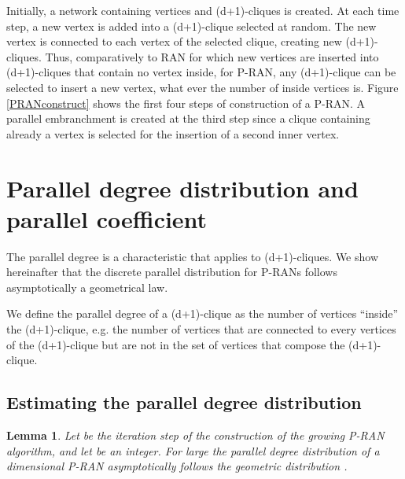 \documentclass[11pt]{iopart}
\newtheorem{lemma}[theorem]{Lemma}
\newenvironment{definition}[1][Definition]{\begin{trivlist}
    \item[\hskip \labelsep {\bfseries #1}]}{\end{trivlist}}
\begin{document}
Initially, a network containing  vertices and   (d+1)-cliques is created.
At each time step, a new vertex is added into a (d+1)-clique selected at random. The new vertex is connected to each vertex of the selected clique, creating  new (d+1)-cliques. Thus, comparatively to RAN for which new vertices are inserted into (d+1)-cliques that contain no vertex inside, for P-RAN, any (d+1)-clique can be selected to insert a new vertex, what ever the number of inside vertices is.
Figure \ref{PRANconstruct} shows the first four steps of construction of a P-RAN. A parallel embranchment is created at the third step since a clique containing already a vertex is selected for the insertion of a second inner vertex.


\section{Parallel degree distribution and parallel coefficient}
\label{Parallel degree distribution}

The parallel degree is a characteristic that applies to (d+1)-cliques. We show hereinafter that the discrete parallel distribution for P-RANs follows asymptotically a geometrical law.

\begin{definition}
We define the parallel degree of a (d+1)-clique as the number of vertices ``inside'' the (d+1)-clique, e.g. the number of vertices that are  connected to every vertices of the (d+1)-clique but are not in the set of vertices that compose the (d+1)-clique. 
\end{definition}

\subsection{Estimating the parallel degree distribution}
\begin{lemma}
\label{ParallelDegreeLemma}
Let  be the iteration step of the construction of the growing P-RAN algorithm, and let  be an integer. For large  the parallel degree distribution of a  dimensional P-RAN asymptotically follows the geometric distribution .
\end{lemma}
\end{document}

